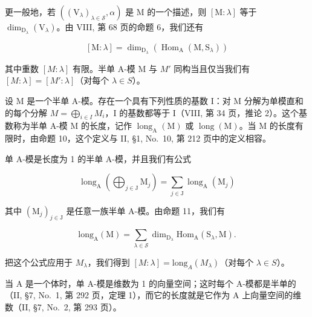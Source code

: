 更一般地，若 \(((\mathrm{V}_{\lambda})_{\lambda \in \mathcal{S}},\alpha)\) 是 M 的一个描述，则 \([\mathrm{M}:\lambda ]\) 等于 \(\dim_{\mathrm{D}_{\lambda}}(\mathrm{V}_{\lambda})\)。由 VIII, 第 68 页的命题 6，我们还有

\[
[ \mathrm{M}: \lambda ] = \dim_ {\mathrm{D} _ {\lambda}} (\operatorname{Hom} _ {\mathrm{A}} (\mathrm{M}, \mathrm{S} _ {\lambda}))\tag{12}
\]

其中重数 \([M : \lambda]\) 有限。半单 A-模 M 与 \(M'\) 同构当且仅当我们有 \([M : \lambda] = [M' : \lambda]\)（对每个 \(\lambda \in S\)）。

设 M 是一个半单 A-模。存在一个具有下列性质的基数 I：对 M 分解为单模直和的每个分解 \(M = \bigoplus_{i \in I} M_i\)，I 的基数都等于 I（VIII, 第 34 页，推论 2）。这个基数称为半单 A-模 M 的长度，记作 \(\operatorname{long}_{\mathrm{A}}(\mathrm{M})\) 或 \(\operatorname{long}(\mathrm{M})\)。当 M 的长度有限时，由命题 10，这个定义与 II, §1, No.~10, 第 212 页中的定义相容。

单 A-模是长度为 1 的半单 A-模，并且我们有公式

\[
\operatorname{long} _ {\mathrm{A}} \left(\bigoplus_ {j \in \mathrm{J}} \mathrm{M} _ {j}\right) = \sum_ {j \in \mathrm{J}} \operatorname{long} _ {\mathrm{A}} (\mathrm{M} _ {j})\tag{13}
\]

其中 \((\mathrm{M}_j)_{j\in \mathrm{J}}\) 是任意一族半单 A-模。由命题 11，我们有

\[
\mathrm{long} _ {\mathrm{A}} (\mathrm{M}) = \sum_ {\lambda \in \mathcal {S}} \dim_ {\mathrm{D} _ {\lambda}} \mathrm{Hom} _ {\mathrm{A}} (\mathrm{S} _ {\lambda}, \mathrm{M}).\tag{14}
\]

把这个公式应用于 \(M_{\lambda}\)，我们得到 \([M : \lambda] = \text{long}_{A}(M_{\lambda})\)（对每个 \(\lambda \in S\)）。

当 A 是一个体时，单 A-模是维数为 1 的向量空间；这时每个 A-模都是半单的（II, §7, No.~1, 第 292 页，定理 1），而它的长度就是它作为 A 上向量空间的维数（II, §7, No.~2, 第 293 页）。

